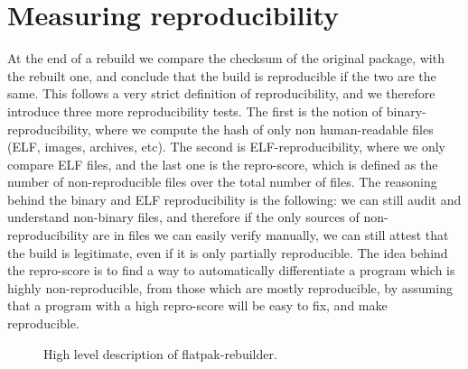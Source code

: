 \documentclass[a4paper,11pt,oneside]{report}
\theoremstyle{definition}
\newcommand{\sysname}{flatpak-rebuilder\xspace}
\begin{document}
\section{Measuring reproducibility}
At the end of a rebuild we compare the checksum of the original package, with
the rebuilt one, and conclude that the build is reproducible if the two are the
same. This follows a very strict definition of reproducibility, and we
therefore introduce three more reproducibility tests. The first is the notion
of binary-reproducibility, where we compute the hash of only non human-readable
files (ELF, images, archives, etc). The second is ELF-reproducibility, where we
only compare ELF files, and the last one is the repro-score, which is defined
as the number of non-reproducible files over the total number of files. The
reasoning behind the binary and ELF reproducibility is the following: we can
still audit and understand non-binary files, and therefore if the only sources
of non-reproducibility are in files we can easily verify manually, we can still
attest that the build is legitimate, even if it is only partially reproducible.
The idea behind the repro-score is to find a way to automatically differentiate
a program which is highly non-reproducible, from those which are mostly
reproducible, by assuming that a program with a high repro-score will be easy
to fix, and make reproducible.

\begin{figure}[h]
    \caption{High level description of \sysname.}
    \label{fig:flatpakrebuilder}
\end{figure}
\end{document}

